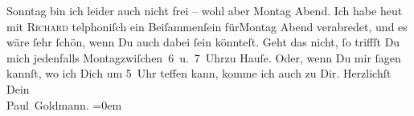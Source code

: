 \begin{ledgroupsized}[t]{13cm}
                  {\pb}Sonntag bin ich leider auch nicht frei – wohl aber
                  Montag{ }Abend. Ich habe heut mit \textsc{Richard} telphoniſch ein Beiſammenſein fürMontag{ }Abend verabredet, und es wäre ſehr ſchön, wenn Du auch dabei ſein
               könnteſt. Geht das nicht, ſo triffſt Du mich jedenfalls Montagzwiſchen 6 u. 7 Uhrzu Hauſe. Oder, wenn Du mir
               ſagen kannſt, wo ich Dich um 5 Uhr teffen kann, komme ich auch zu
               Dir.\pend
           \pstart
           Herzlichſt {\\[\baselineskip]}Dein {\\[\baselineskip]}\spacefill\mbox{Paul Goldmann.}\pend
           \leftskip=0em{}
         
         \endnumbering{}\end{ledgroupsized}\begin{anhang}\end{anhang}\newcommand{\dateiname}{L03456}\newcommand{\titel}{Paul Goldmann an Arthur Schnitzler, 18. 11. [1904]}\newcommand{\editorInnen}{Martin Anton Müller und Laura Untner}
      